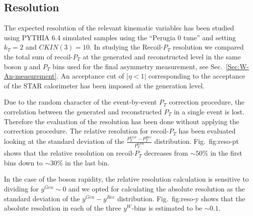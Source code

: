 \documentclass[12pt]{article}
\begin{document}
\subsection{Resolution}
The expected resolution of the relevant kinematic variables has been studied using PYTHIA 6.4 simulated samples using the ``Perugia 0 tune'' and setting $k_{T}=2$ and $CKIN(3)=10$. 
In studying the Recoil-$P_{T}$ resolution we compared the total sum of recoil-$P_{T}$ at the generated and reconstructed level in the same boson $y$ and $P_{T}$ bins used for the final asymmetry measurement, see Sec.~\ref{Sec:W-An-measurement}. An acceptance cut of $|\eta < 1|$ corresponding to the acceptance of the STAR calorimeter has been imposed at the generation level.

Due to the random character of the event-by-event $P_{T}$ correction procedure, the correlation between the generated and reconstructed $P_{T}$ in a single event is lost. Therefore the evaluation of the resolution has been done without applying the correction procedure.  
The relative resolution for recoil-$P_{T}$ has been evaluated looking at the standard deviation of the $\frac{P_{T}^{Gen}-P_{T}^{Rec}}{P_{T}^{Gen}}$ distribution. Fig.~{fig:reso-pt} shows that the relative resolution on recoil-$P_{T}$ decreases from $\sim 50\%$ in the first bins down to $\sim 30\%$ in the last bin.

In the case of the boson rapidity, the relative resolution calculation is sensitive to dividing for $y^{Gen}\sim 0$ and we opted for calculating the absolute resolution as the standard deviation of the $y^{Gen}-y^{Rec}$ distribution. Fig.~{fig:reso-y} shows that the absolute resolution in each of the three $y^{W}$-bins is estimated to be $\sim 0.1$. 
\end{document}
